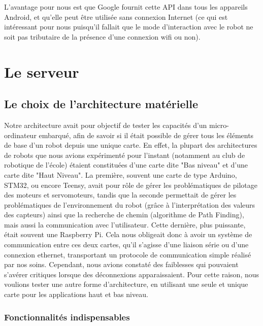 \documentclass{report}
\begin{document}
        {L'avantage pour nous est que Google fournit cette API dans tous les appareils
        Android, et qu'elle peut être utilisée sans connexion Internet (ce qui est intéressant
        pour nous puisqu'il fallait que le mode d'interaction avec le robot ne soit pas
        tributaire de la présence d'une connexion wifi ou non).}

    \section{Le serveur}

    \subsection{Le choix de l'architecture matérielle}

    {Notre architecture avait pour objectif de tester les capacités d'un
    micro-ordinateur embarqué, afin de savoir si il était possible de gérer
    tous les éléments de base d'un robot depuis une unique carte. En effet,
    la plupart des architectures de robots que nous avions expérimenté pour l'instant
    (notamment au club de robotique de l'école) étaient constituées d'une carte
    dite "Bas niveau" et d'une carte dite "Haut Niveau". La première, souvent une carte
    de type Arduino, STM32, ou encore Teensy, avait pour rôle de gérer les
    problématiques de pilotage des moteurs et servomoteurs, tandis que la seconde
    permettait de gérer les problématiques de l'environnement du robot (grâce à l'interprétation
    des valeurs des capteurs) ainsi que la recherche de chemin (algorithme de Path Finding),
    mais aussi la communication avec l'utilisateur. Cette dernière, plus puissante,
    était souvent une Raspberry Pi. Cela nous obligeait donc à avoir
    un système de communication entre ces deux cartes, qu'il s'agisse d'une liaison série
    ou d'une connexion ethernet, transportant un protocole de communication simple réalisé
    par nos soins. Cependant, nous avions constaté des faiblesses qui pouvaient s'avérer
    critiques lorsque des déconnexions apparaissaient. Pour cette raison, nous voulions
    tester une autre forme d'architecture, en utilisant une seule et unique carte pour
    les applications haut et bas niveau.}

    \subsubsection{Fonctionnalités indispensables}
\end{document}
